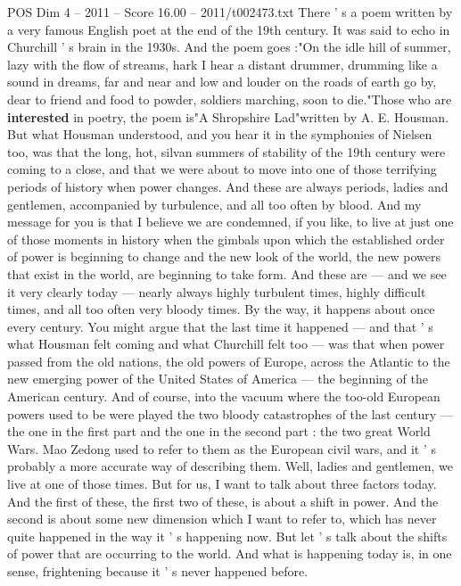 \begin{textsample}{POS Dim 4 – 2011 – Score 16.00 – 2011/t002473.txt}  \label{ex:f4_pos_076}
There ' s a poem written by a very famous English poet at the end of the 19th century.
It was said to echo in Churchill ' s brain in the 1930s.
And the poem goes :"On the idle hill of summer, lazy with the flow of streams, hark I hear a distant drummer, drumming like a sound in dreams, far and near and low and louder on the roads of earth go by, dear to friend and food to powder, soldiers marching, soon to die."Those who are \textbf{interested} in poetry, the poem is"A Shropshire Lad"written by A.
E.
Housman.
But what Housman understood, and you hear it in the symphonies of Nielsen too, was that the long, hot, silvan summers of stability of the 19th century were coming to a close, and that we were about to move into one of those terrifying periods of history when power changes.
And these are always periods, ladies and gentlemen, accompanied by turbulence, and all too often by blood.
And my message for you is that I believe we are condemned, if you like, to live at just one of those moments in history when the gimbals upon which the established order of power is beginning to change and the new look of the world, the new powers that exist in the world, are beginning to take form.
And these are — and we see it very clearly today — nearly always highly turbulent times, highly difficult times, and all too often very bloody times.
By the way, it happens about once every century.
You might argue that the last time it happened — and that ' s what Housman felt coming and what Churchill felt too — was that when power passed from the old nations, the old powers of Europe, across the Atlantic to the new emerging power of the United States of America — the beginning of the American century.
And of course, into the vacuum where the too-old European powers used to be were played the two bloody catastrophes of the last century — the one in the first part and the one in the second part : the two great World Wars.
Mao Zedong used to refer to them as the European civil wars, and it ' s probably a more accurate way of describing them.
Well, ladies and gentlemen, we live at one of those times.
But for us, I want to talk about three factors today.
And the first of these, the first two of these, is about a shift in power.
And the second is about some new dimension which I want to refer to, which has never quite happened in the way it ' s happening now.
But let ' s talk about the shifts of power that are occurring to the world.
And what is happening today is, in one sense, frightening because it ' s never happened before.

\end{textsample}
